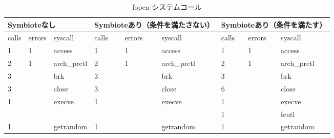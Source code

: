 \documentclass[submit,techreq,noauthor]{eco}	%
\begin{document}
\begin{table*}[t]
  \centering
  \caption{fopen システムコール}
  \label{table: fopen}
  \begin{tabular}{|lll|lll|lll|}
  \hline
  \multicolumn{3}{|l|}{Symbioteなし}                                              & \multicolumn{3}{l|}{Symbioteあり（条件を満たさない）}                                    & \multicolumn{3}{l|}{Symbioteあり（条件を満たす）}                                      \\ \hline
  \multicolumn{1}{|l|}{calls} & \multicolumn{1}{l|}{errors} & syscall           & \multicolumn{1}{l|}{calls} & \multicolumn{1}{l|}{errors} & syscall           & \multicolumn{1}{l|}{calls} & \multicolumn{1}{l|}{errors} & syscall           \\ \hline
  \multicolumn{1}{|l|}{1}     & \multicolumn{1}{l|}{1}      & access            & \multicolumn{1}{l|}{1}     & \multicolumn{1}{l|}{1}      & access            & \multicolumn{1}{l|}{1}     & \multicolumn{1}{l|}{1}      & access            \\
  \multicolumn{1}{|l|}{2}     & \multicolumn{1}{l|}{1}      & arch\_prctl       & \multicolumn{1}{l|}{2}     & \multicolumn{1}{l|}{1}      & arch\_prctl       & \multicolumn{1}{l|}{2}     & \multicolumn{1}{l|}{1}      & arch\_prctl       \\
  \multicolumn{1}{|l|}{3}     & \multicolumn{1}{l|}{}       & brk               & \multicolumn{1}{l|}{3}     & \multicolumn{1}{l|}{}       & brk               & \multicolumn{1}{l|}{3}     & \multicolumn{1}{l|}{}       & brk               \\
  \multicolumn{1}{|l|}{3}     & \multicolumn{1}{l|}{}       & close             & \multicolumn{1}{l|}{3}     & \multicolumn{1}{l|}{}       & close             & \multicolumn{1}{l|}{6}     & \multicolumn{1}{l|}{}       & close             \\
  \multicolumn{1}{|l|}{1}     & \multicolumn{1}{l|}{}       & execve            & \multicolumn{1}{l|}{1}     & \multicolumn{1}{l|}{}       & execve            & \multicolumn{1}{l|}{1}     & \multicolumn{1}{l|}{}       & execve            \\
  \multicolumn{1}{|l|}{}      & \multicolumn{1}{l|}{}       &                   & \multicolumn{1}{l|}{}      & \multicolumn{1}{l|}{}       &                   & \multicolumn{1}{l|}{1}     & \multicolumn{1}{l|}{}       & fcntl             \\
  \multicolumn{1}{|l|}{1}     & \multicolumn{1}{l|}{}       & getrandom         & \multicolumn{1}{l|}{1}     & \multicolumn{1}{l|}{}       & getrandom         & \multicolumn{1}{l|}{1}     & \multicolumn{1}{l|}{}       & getrandom         \\

\end{tabular}
\end{table*}
\end{document}
